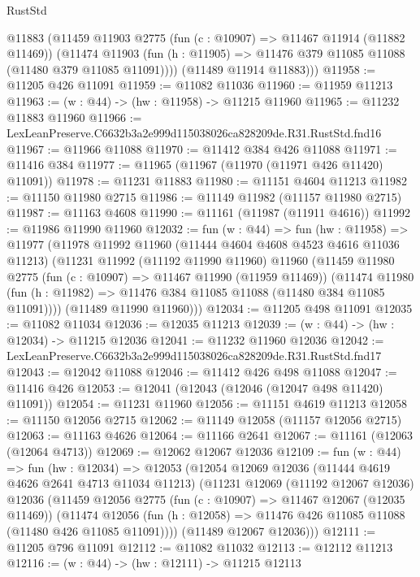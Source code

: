 \begin{lexlean}{RustStd}
\begin{coremodule}
        @11883
        (@11459
          @11903
          @2775
          (fun (c : @10907) => @11467 @11914 (@11882 @11469))
          (@11474
            @11903
            (fun (h : @11905) => @11476 @379 @11085 @11088 (@11480 @379 @11085 @11091))))
        (@11489 @11914 @11883)))
@11958 := @11205 @426 @11091
@11959 := @11082 @11036
@11960 := @11959 @11213
@11963 := (w : @44) -> (hw : @11958) -> @11215 @11960
@11965 := @11232 @11883 @11960
@11966 := LexLeanPreserve.C6632b3a2e999d115038026ca828209de.R31.RustStd.fnd16
@11967 := @11966 @11088
@11970 := @11412 @384 @426 @11088
@11971 := @11416 @384
@11977 := @11965 (@11967 (@11970 (@11971 @426 @11420) @11091))
@11978 := @11231 @11883
@11980 := @11151 @4604 @11213
@11982 := @11150 @11980 @2715
@11986 := @11149 @11982 (@11157 @11980 @2715)
@11987 := @11163 @4608
@11990 := @11161 (@11987 (@11911 @4616))
@11992 := @11986 @11990 @11960
@12032 := fun (w : @44) =>
  fun (hw : @11958) =>
  @11977
    (@11978
      @11992
      @11960
      (@11444 @4604 @4608 @4523 @4616 @11036 @11213)
      (@11231
        @11992
        (@11192 @11990 @11960)
        @11960
        (@11459
          @11980
          @2775
          (fun (c : @10907) => @11467 @11990 (@11959 @11469))
          (@11474
            @11980
            (fun (h : @11982) => @11476 @384 @11085 @11088 (@11480 @384 @11085 @11091))))
        (@11489 @11990 @11960)))
@12034 := @11205 @498 @11091
@12035 := @11082 @11034
@12036 := @12035 @11213
@12039 := (w : @44) -> (hw : @12034) -> @11215 @12036
@12041 := @11232 @11960 @12036
@12042 := LexLeanPreserve.C6632b3a2e999d115038026ca828209de.R31.RustStd.fnd17
@12043 := @12042 @11088
@12046 := @11412 @426 @498 @11088
@12047 := @11416 @426
@12053 := @12041 (@12043 (@12046 (@12047 @498 @11420) @11091))
@12054 := @11231 @11960
@12056 := @11151 @4619 @11213
@12058 := @11150 @12056 @2715
@12062 := @11149 @12058 (@11157 @12056 @2715)
@12063 := @11163 @4626
@12064 := @11166 @2641
@12067 := @11161 (@12063 (@12064 @4713))
@12069 := @12062 @12067 @12036
@12109 := fun (w : @44) =>
  fun (hw : @12034) =>
  @12053
    (@12054
      @12069
      @12036
      (@11444 @4619 @4626 @2641 @4713 @11034 @11213)
      (@11231
        @12069
        (@11192 @12067 @12036)
        @12036
        (@11459
          @12056
          @2775
          (fun (c : @10907) => @11467 @12067 (@12035 @11469))
          (@11474
            @12056
            (fun (h : @12058) => @11476 @426 @11085 @11088 (@11480 @426 @11085 @11091))))
        (@11489 @12067 @12036)))
@12111 := @11205 @796 @11091
@12112 := @11082 @11032
@12113 := @12112 @11213
@12116 := (w : @44) -> (hw : @12111) -> @11215 @12113

\end{coremodule}
\end{lexlean}
